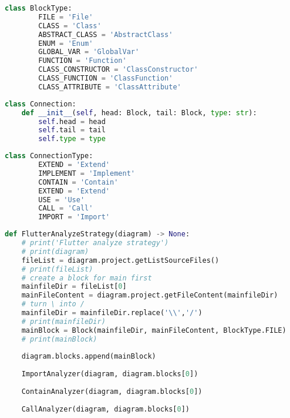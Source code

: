\begin{lstlisting}[language=Python, caption={$\texttt{BlockType}$ class (Enumerate).}, label={lst:5}]
    class BlockType:
        FILE = 'File'
        CLASS = 'Class'
        ABSTRACT_CLASS = 'AbstractClass'
        ENUM = 'Enum'
        GLOBAL_VAR = 'GlobalVar'
        FUNCTION = 'Function'
        CLASS_CONSTRUCTOR = 'ClassConstructor'
        CLASS_FUNCTION = 'ClassFunction'
        CLASS_ATTRIBUTE = 'ClassAttribute'
\end{lstlisting}

\begin{lstlisting}[language=Python, caption={$\texttt{Connection}$ class.}, label={lst:6}]
    class Connection:
    def __init__(self, head: Block, tail: Block, type: str):
        self.head = head
        self.tail = tail
        self.type = type
\end{lstlisting}

\begin{lstlisting}[language=Python, caption={$\texttt{ConnectionType}$ class (Enumerate).}, label={lst:7}]
    class ConnectionType:
        EXTEND = 'Extend'
        IMPLEMENT = 'Implement'
        CONTAIN = 'Contain'
        EXTEND = 'Extend'
        USE = 'Use'
        CALL = 'Call'
        IMPORT = 'Import'
\end{lstlisting}
 
\begin{lstlisting}[language=Python, caption={$\texttt{FlutterAnalyzeStrategy}$ function.}, label={lst:8}]
    def FlutterAnalyzeStrategy(diagram) -> None:
    # print('Flutter analyze strategy')
    # print(diagram)
    fileList = diagram.project.getListSourceFiles()
    # print(fileList)
    # create a block for main first
    mainfileDir = fileList[0]
    mainFileContent = diagram.project.getFileContent(mainfileDir)
    # turn \ into /
    mainfileDir = mainfileDir.replace('\\','/')
    # print(mainfileDir)
    mainBlock = Block(mainfileDir, mainFileContent, BlockType.FILE)
    # print(mainBlock)
    
    diagram.blocks.append(mainBlock)
    
    ImportAnalyzer(diagram, diagram.blocks[0])
    
    ContainAnalyzer(diagram, diagram.blocks[0])
    
    CallAnalyzer(diagram, diagram.blocks[0])
\end{lstlisting}


